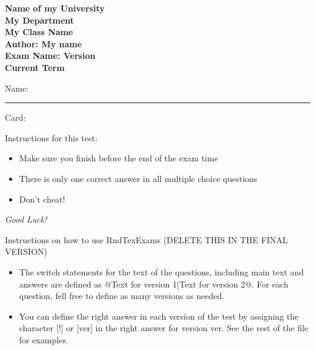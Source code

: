 \documentclass[10pt]{examdesign}
\newcommand{\myversion}{} %
\newcommand{\UniName}{Name of my University}
\newcommand{\DeptName}{My Department}
\newcommand{\ClassName}{My Class Name}
\newcommand{\MyName}{Author: My name}
\newcommand{\ExamName}{Exam Name: Version \myversion}
\newcommand{\TermName}{Current Term}
\begin{document}
\begin{examtop}

\begin{center}
    \textbf{\Large \UniName} \\
    \textbf{\Large \DeptName} \vspace{0.5cm}  \\
    \textbf{\Large \ClassName} \\
    \textbf{\Large \MyName} \\
    \textbf{\Large \ExamName } \\
    \textbf{\Large \TermName}
 \end{center}

\vspace{1cm}
Name: \rule{4in}{.4pt}  \quad  \noindent Card:\enspace\hrulefill


\vspace{1cm}

\small

\begin{framed}

Instructions for this test:

\begin{itemize}

	\item Make sure you finish before the end of the exam time

	\item There is only one correct answer in all multiple choice questions

	\item Don't cheat!

\end{itemize}

\vspace{0.5cm}

{\large \emph{Good Luck!}}
\end{framed}

\begin{framed}
	Instructions on how to use RndTexExams (DELETE THIS IN THE FINAL VERSION)
	\begin{itemize}

		\item The switch statements for the text of the questions, including main text and answers are defined as @{Text for version 1}|{Text for version 2}@. For each question, fell free to define as many versions as needed.

		\item You can define the right answer in each version of the test by assigning the character [!] or [ver] in the right answer for version ver. See the rest of the file for examples.


	\end{itemize}

\end{framed}

\end{examtop}
\end{document}
